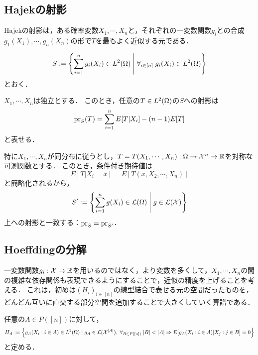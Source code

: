 \documentclass[uplatex,dvipdfmx]{jsreport}
\begin{document}
\subsection{Hajekの射影}

\begin{tcolorbox}[colframe=ForestGreen, colback=ForestGreen!10!white,breakable,colbacktitle=ForestGreen!40!white,coltitle=black,fonttitle=\bfseries\sffamily,
title=]
    Hajekの射影は，ある確率変数$X_1,\cdots,X_n$と，それぞれの一変数関数$g_i$との合成$g_1(X_1),\cdots,g_n(X_n)$の形で$T$を最もよく近似する元である．
\end{tcolorbox}

\begin{notation}
    \[S:=\left\{\sum^n_{i=1}g_i(X_i)\in L^2(\Omega)\;\middle|\;\forall_{i\in[n]}\;g_i(X_i)\in L^2(\Omega)\right\}\]
    とおく．
\end{notation}

\begin{lemma}
    $X_1,\cdots,X_n$は独立とする．
    このとき，任意の$T\in L^2(\Omega)$の$S$への射影は
    \[\mathrm{pr}_S(T)=\sum_{i=1}^nE[T|X_i]-(n-1)E[T]\]
    と表せる．
\end{lemma}

\begin{remarks}
    特に$X_1,\cdots,X_n$が同分布に従うとし，$T=T(X_1,\cdots,X_n):\Omega\to\mathcal{X}^n\to\mathbb{R}$を対称な可測関数とする．
    このとき，条件付き期待値は
    \[E[T|X_i=x]=E[T(x,X_2,\cdots,X_n)]\]
    と簡略化されるから，
    \[S':=\left\{\sum^n_{i=1}g(X_i)\in\mathcal{L}(\Omega)\;\middle|\;g\in\mathcal{L}(\mathcal{X})\right\}\]
    上への射影と一致する：$\mathrm{pr}_S=\mathrm{pr}_{S'}$．
\end{remarks}

\subsection{Hoeffdingの分解}

\begin{tcolorbox}[colframe=ForestGreen, colback=ForestGreen!10!white,breakable,colbacktitle=ForestGreen!40!white,coltitle=black,fonttitle=\bfseries\sffamily,
title=]
    一変数関数$g_i:\mathcal{X}\to\mathbb{R}$を用いるのではなく，より変数を多くして，$X_1,\cdots,X_n$の間の複雑な依存関係も表現できるようにすることで，近似の精度を上げることを考える．
    これは，初めは$(H_{i})_{i\in[n]}$の線型結合で表せる元の空間だったものを，どんどん互いに直交する部分空間を追加することで大きくしていく算譜である．
\end{tcolorbox}

\begin{notation}
    任意の$A\in P([n])$に対して，
    \[H_A:=\left\{g_A(X_i:i\in A)\in L^2(\Omega)\mid g_A\in\mathcal{L}(\mathcal{X}^{\lvert A\rvert}),\;\forall_{B\in P([n])}\;\lvert B\rvert<\lvert A\rvert\Rightarrow E[g_A(X_i:i\in A)|X_j:j\in B]=0\right\}\]
    と定める．
\end{notation}
\end{document}
